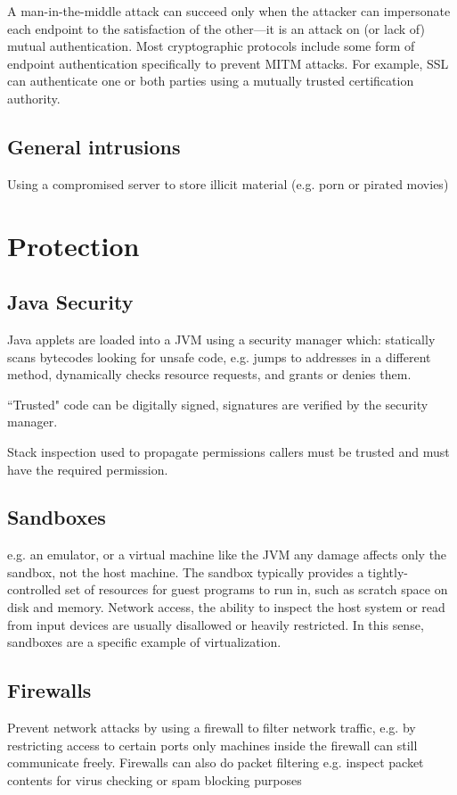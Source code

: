 \documentclass[a4paper,oneside]{report}
\begin{document}
A man-in-the-middle attack can succeed only when the attacker can impersonate each endpoint to the satisfaction of the other—it is an attack on (or lack of) mutual authentication. Most cryptographic protocols include some form of endpoint authentication specifically to prevent MITM attacks. For example, SSL can authenticate one or both parties using a mutually trusted certification authority.

		\subsection{General intrusions}
		Using a compromised server to store illicit material (e.g. porn or pirated movies)


	  	\section{Protection}
		
		\subsection{Java Security}
		Java applets are loaded into a JVM using a security manager which: statically scans bytecodes looking for unsafe code, e.g. jumps to addresses in a different method, dynamically checks resource requests, and grants or denies them.

		``Trusted" code can be digitally signed, signatures are verified by the security manager.

		Stack inspection used to propagate permissions callers must be trusted and must have the required permission.


 		\subsection{Sandboxes}
		 e.g. an emulator, or a virtual machine like the JVM any damage affects only the sandbox, not the host machine.
		The sandbox typically provides a tightly-controlled set of resources for guest programs to run in, such as scratch space on disk and memory. Network access, the ability to inspect the host system or read from input devices are usually disallowed or heavily restricted. In this sense, sandboxes are a specific example of virtualization.

		\subsection{Firewalls}
		Prevent network attacks by using a firewall to filter network traffic, e.g. by restricting access to certain ports only machines inside the firewall can still communicate freely.
		Firewalls can also do packet filtering e.g. inspect packet contents for virus checking or spam blocking purposes
\end{document}
